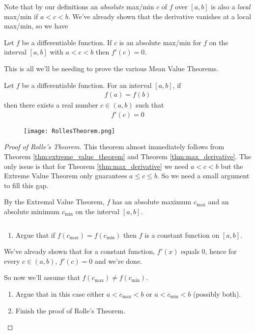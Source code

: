 Note that by our definitions an {\it absolute} max/min $c$ of $f$ over $[a,b]$ is also a {\it local} max/min if $a < c < b$. We've already shown that the derivative vanishes at a local max/min, so we have
\begin{theorem}
	\label{thm:max_derivative}
	Let $f$ be a differentiable function. If $c$ is an absolute max/min for $f$ on the interval $[a,b]$ with $a < c < b$ then $f'(c) = 0$.
\end{theorem}

This is all we'll be needing to prove the various Mean Value Theorems.

\begin{theorem}
	Let $f$ be a differentiable function. For an interval $[a,b]$, if
	\begin{align*}
		f(a) = f(b)
	\end{align*}
	then there exists a real number $c \in (a,b)$ such that
	\begin{align*}
		f'(c) = 0
	\end{align*}
	\begin{figure}[H]
		\centering
		\texttt{[image: RollesTheorem.png]}
	\end{figure}
\end{theorem}
\begin{proof}[Proof of Rolle's Theorem]
	This theorem almost immediately follows from Theorem \ref{thm:extreme_value_theorem} and Theorem \ref{thm:max_derivative}. The only issue is that for Theorem \ref{thm:max_derivative} we need $a < c < b$ but the Extreme Value Theorem only guarantees $a \le c \le b$. So we need a small argument to fill this gap.

	By the Extremal Value Theorem, $f$ has an absolute maximum $c_{\max}$ and an absolute minimum $c_{\min}$ on the interval $[a,b]$.

	\begin{exercise}$ $
		\begin{enumerate}
			\item Argue that if $f(c_{\max}) = f(c_{\min})$ then $f$ is a constant function on $[a,b]$.
		\end{enumerate}
		We've already shown that for a constant function, $f'(x)$ equals 0, hence for every $c \in (a,b)$, $f'(c) = 0$ and we're done.

		So now we'll assume that $f(c_{\max}) \neq f(c_{\min})$.

		\begin{enumerate}[resume]
			\item 		Argue that in this case either $a < c_{\max} < b$ or $a < c_{\min}< b$ (possibly both).
			\item 		Finish the proof of Rolle's Theorem.
		\end{enumerate}
	\end{exercise}
\end{proof}


